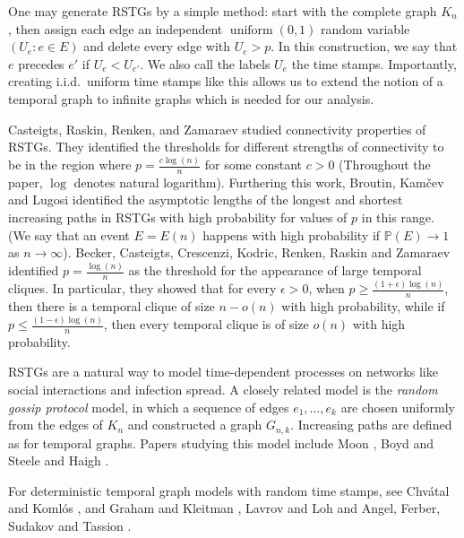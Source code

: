 \documentclass[11pt]{article}
\newcommand{\1}{\mathbf{1}} %
\newcommand{\prob}{\mathbb{P}} %
\newcommand{\unif}{\ensuremath{\operatorname{uniform}}} %
\begin{document}
One may generate RSTGs by a simple method: start with the complete graph $K_n$, then assign each edge an independent $\unif(0,1)$ random variable $(U_e : e \in E)$ and delete every edge with $U_e > p$. In this construction, we say that $e$ precedes $e'$ if $U_e < U_{e'}$. We also call the labels $U_e$ the time stamps. Importantly, creating i.i.d.\ uniform time stamps like this allows us to extend the notion of a temporal graph to infinite graphs which is needed for our analysis.

Casteigts, Raskin, Renken, and Zamaraev \cite{Casteigts2023} studied connectivity properties of RSTGs. They
identified the thresholds for different strengths of connectivity to
be in the region where $p = \frac{c\log(n)}{n}$ for some constant $c >
0$
  (Throughout the paper, $\log$ denotes natural logarithm).
Furthering this work, Broutin, Kamčev and Lugosi \cite{Broutin2023} identified the asymptotic lengths of the longest and shortest increasing paths in RSTGs with high probability for values of $p$ in this range. (We say that an event $E=E(n)$ happens with high probability if $\prob(E) \to 1$ as $n \to \infty$). 
Becker, Casteigts, Crescenzi, Kodric, Renken, Raskin and Zamaraev  \cite{Becker2023} identified $p = \frac{\log(n)}{n}$ as the threshold for the appearance of large temporal cliques. In particular, they showed that for every $\epsilon >0$,
when $p \ge \frac{(1+\epsilon)\log(n)}{n}$, then
there is a temporal clique of size $n-o(n)$ with high probability, while  if
$p \le \frac{(1-\epsilon)\log(n)}{n}$, then every temporal clique is of size $o(n)$ with high probability.

RSTGs are a natural way to model time-dependent processes on networks like social interactions and infection spread. A closely related model is the \textit{random gossip protocol} model, in which a sequence of edges $e_1,\ldots,e_k$ are chosen uniformly from the edges of $K_n$ and constructed a graph $G_{n,k}$. Increasing paths are defined as for temporal graphs. Papers studying this model include Moon \cite{Moon1972}, Boyd and Steele \cite{Boyd1979}
and Haigh \cite{Haigh1981}.

For deterministic temporal graph models with random time stamps, see Chv\'{a}tal and Koml\'os \cite{Chvatal1971}, and Graham and Kleitman \cite{Graham1973}, 
Lavrov and Loh \cite{Lavrov2016} and Angel, Ferber, Sudakov and Tassion \cite{Angel2020}.
\end{document}
